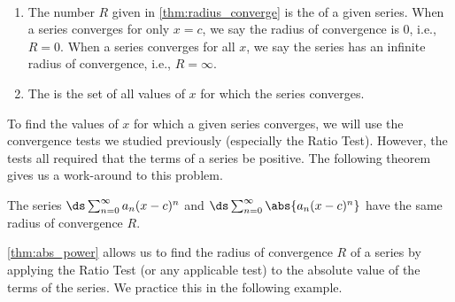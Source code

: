 \begin{definition}\label{def:radius_converge}
\mbox{}\\[-2\baselineskip]
\begin{enumerate}
	\item The number $R$ given in \autoref{thm:radius_converge} is the  of a given series. When a series converges for only $x=c$, we say the radius of convergence is 0, i.e.,  $R=0$. When a series converges for all $x$, we say the series has an infinite radius of convergence, i.e., $R=\infty$.
	\item	The  is the set of all values of $x$ for which the series converges.
\end{enumerate}
\end{definition}

To find the values of $x$ for which a given series converges, we will use the convergence tests we studied previously (especially the Ratio Test). However, the tests all required that the terms of a series be positive. The following theorem gives us a work-around to this problem.

\begin{theorem}\label{thm:abs_power}
	The series $\ds \sum_{n=0}^\infty a_n(x-c)^n$ and $\ds \sum_{n=0}^\infty \abs{a_n(x-c)^n}$ have the same radius of convergence $R$.
\end{theorem}

\autoref{thm:abs_power} allows us to find the radius of convergence $R$ of a series by applying the Ratio Test (or any applicable test) to the absolute value of the terms of the series. We practice this in the following example.


